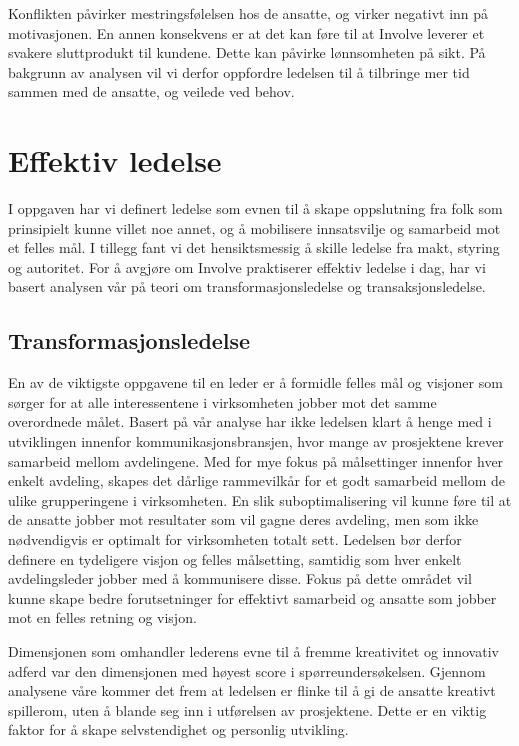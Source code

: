 \indent \newline
Konflikten påvirker mestringsfølelsen hos de ansatte, og virker negativt inn på motivasjonen. En annen konsekvens er at det kan føre til at Involve leverer et svakere sluttprodukt til kundene. Dette kan påvirke lønnsomheten på sikt. På bakgrunn av analysen vil vi derfor oppfordre ledelsen til å tilbringe mer tid sammen med de ansatte, og veilede ved behov. 

\section{Effektiv ledelse}
I oppgaven har vi definert ledelse som evnen til å skape oppslutning fra folk som prinsipielt kunne villet noe annet, og å mobilisere innsatsvilje og samarbeid mot et felles mål. I tillegg fant vi det hensiktsmessig å skille ledelse fra makt, styring og autoritet. For å avgjøre om Involve praktiserer effektiv ledelse i dag, har vi basert analysen vår på teori om transformasjonsledelse og transaksjonsledelse.

\subsection{Transformasjonsledelse}
En av de viktigste oppgavene til en leder er å formidle felles mål og visjoner som sørger for at alle interessentene i virksomheten jobber mot det samme overordnede målet. Basert på vår analyse har ikke ledelsen klart å henge med i utviklingen innenfor kommunikasjonsbransjen, hvor mange av prosjektene krever samarbeid mellom avdelingene. Med for mye fokus på målsettinger innenfor hver enkelt avdeling, skapes det dårlige rammevilkår for et godt samarbeid mellom de ulike grupperingene i virksomheten. En slik suboptimalisering vil kunne føre til at de ansatte jobber mot resultater som vil gagne deres avdeling, men som ikke nødvendigvis er optimalt for virksomheten totalt sett. Ledelsen bør derfor definere en tydeligere visjon og felles målsetting, samtidig som hver enkelt avdelingsleder jobber med å kommunisere disse. Fokus på dette området vil kunne skape bedre forutsetninger for effektivt samarbeid og ansatte som jobber mot en felles retning og visjon.

\indent \newline
Dimensjonen som omhandler lederens evne til å fremme kreativitet og innovativ adferd var den dimensjonen med høyest score i spørreundersøkelsen. Gjennom analysene våre kommer det frem at ledelsen er flinke til å gi de ansatte kreativt spillerom, uten å blande seg inn i utførelsen av prosjektene. Dette er en viktig faktor for å skape selvstendighet og personlig utvikling. 

